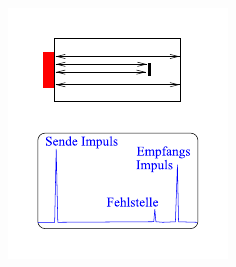 \begin{figure}
\begin{minipage}[t]{.45\linewidth}
      \includegraphics[width=\linewidth]{pictures/Zeichnung2.pdf}
      \label{fig:Zeichnung2}
    \end{minipage}
\end{figure}